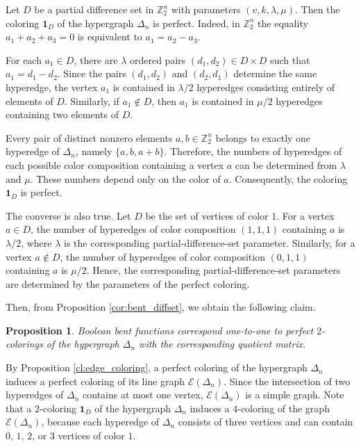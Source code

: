 \documentclass[11pt]{article}
\newtheorem{claim}{Proposition}[section]
\theoremstyle{definition}
\begin{document}
{{{Let $D$ be a partial difference set in $\mathbb{Z}_2^n$ with parameters $(v,k,\lambda,\mu)$. Then the coloring ${\mathbf 1}_D$ of the hypergraph $\Delta_n$ is perfect. Indeed, in $\mathbb{Z}_2^n$ the equality
$a_1+a_2+a_3=0$
is equivalent to
$a_1=a_2-a_3$.

For each $a_1\in D$, there are $\lambda$ ordered pairs $(d_1,d_2)\in D\times D$ such that
$a_1=d_1-d_2$.
Since the pairs $(d_1,d_2)$ and $(d_2,d_1)$ determine the same hyperedge, the vertex $a_1$ is contained in $\lambda/2$ hyperedges consisting entirely of elements of $D$. Similarly, if $a_1\notin D$, then $a_1$ is contained in $\mu/2$ hyperedges containing two elements of $D$.

Every pair of distinct nonzero elements $a,b\in\mathbb{Z}_2^n$ belongs to exactly one hyperedge of $\Delta_n$, namely
$\{a,b,a+b\}$.
Therefore, the numbers of hyperedges of each possible color composition containing a vertex $a$ can be determined from $\lambda$ and $\mu$. These numbers depend only on the color of $a$. Consequently, the coloring ${\mathbf 1}_D$ is perfect.

The converse is also true. Let $D$ be the set of vertices of color $1$. For a vertex $a\in D$, the number of hyperedges of color composition $(1,1,1)$ containing $a$ is $\lambda/2$, where $\lambda$ is the corresponding partial-difference-set parameter. Similarly, for a vertex $a\notin D$, the number of hyperedges of color composition $(0,1,1)$ containing $a$ is $\mu/2$. Hence, the corresponding partial-difference-set parameters are determined by the parameters of the perfect coloring.

Then, from Proposition \ref{cor:bent_diffset}, we obtain the following claim.

\begin{claim}\label{avgdop}
Boolean bent functions correspond one-to-one to perfect $2$-colorings of the hypergraph $\Delta_n$ with the corresponding quotient matrix.
\end{claim}

By Proposition \ref{cl:edge_coloring}, a perfect coloring of the hypergraph $\Delta_n$ induces a perfect coloring of its line graph $\mathcal{E}(\Delta_n)$. Since the intersection of two hyperedges of $\Delta_n$ contains at most one vertex, $\mathcal{E}(\Delta_n)$ is a simple graph. Note that a $2$-coloring ${\mathbf 1}_D$ of the hypergraph $\Delta_n$ induces a $4$-coloring of the graph $\mathcal{E}(\Delta_n)$, because each hyperedge of $\Delta_n$ consists of three vertices and can contain $0$, $1$, $2$, or $3$ vertices of color $1$.

}}}
\end{document}
